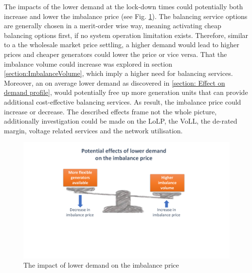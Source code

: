 \documentclass[energies,article,submit,moreauthors,pdftex]{Definitions/mdpi}
\begin{document}
The impacts of the lower demand at the lock-down times could potentially both increase and lower the imbalance price (see Fig. \ref{fig:imbalance-trade-off}). The balancing service options are generally chosen in a merit-order wise way, meaning activating cheap balancing options first, if no system operation limitation exists. Therefore, similar to a the wholesale market price settling, a higher demand would lead to higher prices and cheaper generators could lower the price or vice versa. That the imbalance volume could increase was explored in section \ref{section:ImbalanceVolume}, which imply a higher need for balancing services. Moreover, an on average lower demand as discovered in \ref{section: Effect on demand profile}, would potentially free up more generation units that can provide additional cost-effective balancing services. As result, the imbalance price could increase or decrease. The described effects frame not the whole picture, additionally investigation could be made on the LoLP, the VoLL, the de-rated margin, voltage related services and the network utilisation.

\begin{figure}[H]
\centering
\hspace{-25pt}
\includegraphics[trim={4cm 6.3cm 5cm 1cm},clip,width=1\textwidth]{Graphics/Imbalance-price-trade-off.pdf}
\caption{The impact of lower demand on the imbalance price}
\label{fig:imbalance-trade-off}
\end{figure} 


\end{document}
